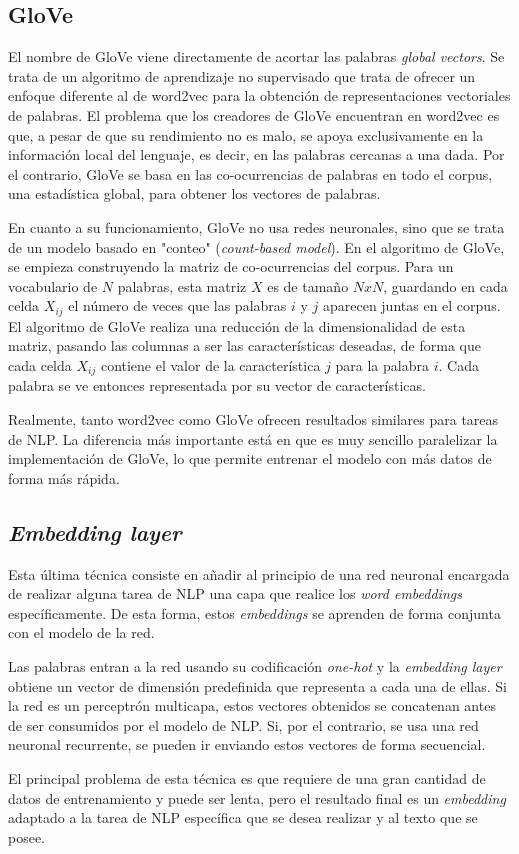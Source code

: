 \subsection{GloVe}

El nombre de GloVe viene directamente de acortar las palabras \textit{global
    vectors}. Se trata de un algoritmo de aprendizaje no supervisado que trata
de ofrecer un enfoque diferente al de word2vec para la obtención de
representaciones vectoriales de palabras. El problema que los creadores de
GloVe encuentran en word2vec es que, a pesar de que su rendimiento no es
malo, se apoya exclusivamente en la información local del lenguaje, es
decir, en las palabras cercanas a una dada. Por el contrario, GloVe se basa
en las co-ocurrencias de palabras en todo el corpus, una estadística global,
para obtener los vectores de palabras.

En cuanto a su funcionamiento, GloVe no usa redes neuronales, sino que se trata
de un modelo basado en "conteo" (\textit{count-based model}). En el algoritmo de
GloVe, se empieza construyendo la matriz de co-ocurrencias del corpus. Para un
vocabulario de $N$ palabras, esta matriz $X$ es de tamaño $NxN$, guardando en
cada celda $X_{ij}$ el número de veces que las palabras $i$ y $j$ aparecen
juntas en el corpus. El algoritmo de GloVe realiza una reducción de la
dimensionalidad de esta matriz, pasando las columnas a ser las características
deseadas, de forma que cada celda $X_{ij}$ contiene el valor de la
característica $j$ para la palabra $i$. Cada palabra se ve entonces representada
por su vector de características.

Realmente, tanto word2vec como GloVe ofrecen resultados similares para tareas de
NLP. La diferencia más importante está en que es muy sencillo paralelizar la
implementación de GloVe, lo que permite entrenar el modelo con más datos de
forma más rápida.

\subsection{\textit{Embedding layer}}
\label{subsec:embedding-layer}

Esta última técnica consiste en añadir al principio de una red neuronal
encargada de realizar alguna tarea de NLP una capa que realice los \textit{word
    embeddings} específicamente. De esta forma, estos \textit{embeddings} se
aprenden de forma conjunta con el modelo de la red.

Las palabras entran a la red usando su codificación \textit{one-hot} y la
\textit{embedding layer} obtiene un vector de dimensión predefinida que
representa a cada una de ellas. Si la red es un perceptrón multicapa, estos
vectores obtenidos se concatenan antes de ser consumidos por el modelo de NLP.
Si, por el contrario, se usa una red neuronal recurrente, se pueden ir enviando
estos vectores de forma secuencial.

El principal problema de esta técnica es que requiere de una gran cantidad de
datos de entrenamiento y puede ser lenta, pero el resultado final es un
\textit{embedding} adaptado a la tarea de NLP específica que se desea realizar
y al texto que se posee.
